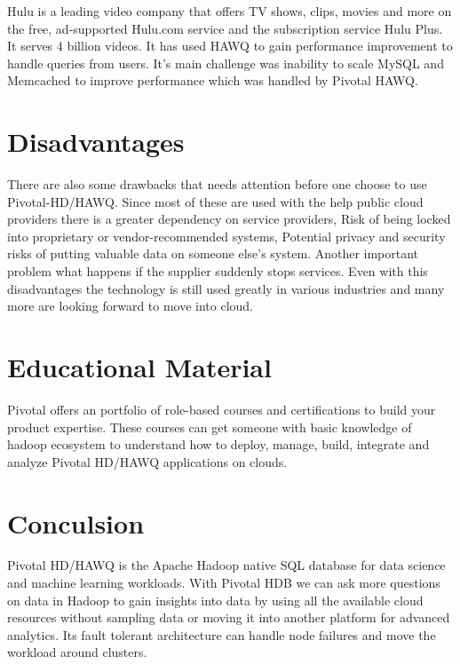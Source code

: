 \documentclass[9pt,twocolumn,twoside]{../../styles/osajnl}
\begin{document}
Hulu is a leading video company that offers TV shows, clips, movies 
and more on the free, ad-supported Hulu.com service and the 
subscription service Hulu Plus. It serves 4 billion videos. It has 
used HAWQ to gain performance improvement to handle queries from 
users. {It's main challenge was inability to scale MySQL and 
Memcached to improve performance which was handled by Pivotal 
HAWQ}\cite{www-pivotal-hulu}.


\section{Disadvantages}

There are also some drawbacks that needs attention before one choose 
to 
use Pivotal-HD/HAWQ. Since most of these are used with the help 
public cloud providers there is a greater dependency on service 
providers, 
Risk of being locked into proprietary or vendor-recommended systems, 
Potential privacy and security risks of putting valuable data on 
someone else's system. 
Another important problem what happens if the supplier suddenly stops 
services. Even with this disadvantages the technology is still used 
greatly in various industries and many more are looking forward to 
move into cloud.

\section{Educational Material}

{Pivotal offers an portfolio of role-based courses and certifications 
to build your product expertise}\cite{www-pivotal-courses}. These 
courses can get someone with basic knowledge of hadoop ecosystem  to 
understand how to deploy, manage, build, integrate and analyze 
Pivotal HD/HAWQ applications on clouds. 

\section{Conculsion}

Pivotal HD/HAWQ is the Apache Hadoop native SQL database for data 
science and machine learning workloads. With Pivotal HDB we can ask 
more questions on data in Hadoop to gain insights into data by using 
all the available cloud resources without sampling data or moving it 
into another platform for advanced analytics. Its fault tolerant 
architecture can handle node failures and move the workload around 
clusters.


\end{document}
